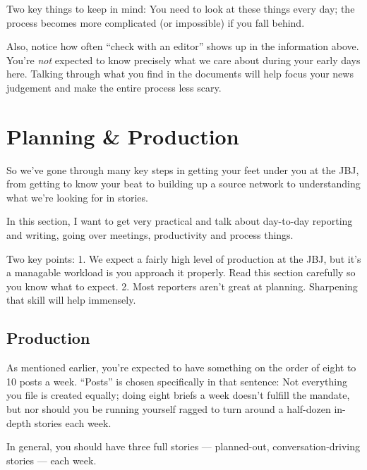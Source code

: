 \documentclass[
  11pt,
  american,
  letterpaperpaper,
  extrafontsizes,onecolumn,openright
  ]{memoir}
\begin{document}
Two key things to keep in mind: You need to look at these things every day; the process becomes more complicated (or impossible) if you fall behind.

Also, notice how often \enquote{check with an editor} shows up in the information above. You're \emph{not} expected to know precisely what we care about during your early days here. Talking through what you find in the documents will help focus your news judgement and make the entire process less scary.

\hypertarget{planning-production}{%
\chapter{Planning \& Production}\label{planning-production}}

So we've gone through many key steps in getting your feet under you at the JBJ, from getting to know your beat to building up a source network to understanding what we're looking for in stories.

In this section, I want to get very practical and talk about day-to-day reporting and writing, going over meetings, productivity and process things.

\leavevmode{}%
\begin{greybox}[frametitle=Onboarding Path]
Two key points: 1. We expect a fairly high level of production at the JBJ, but it's a managable workload is you approach it properly. Read this section carefully so you know what to expect. 2. Most reporters aren't great at planning. Sharpening that skill will help immensely.

\end{greybox}

\hypertarget{production}{%
\section*{Production}\label{production}}

As mentioned earlier, you're expected to have something on the order of eight to 10 posts a week. \enquote{Posts} is chosen specifically in that sentence: Not everything you file is created equally; doing eight briefs a week doesn't fulfill the mandate, but nor should you be running yourself ragged to turn around a half-dozen in-depth stories each week.

In general, you should have three full stories --- planned-out, conversation-driving stories --- each week.
\end{document}
